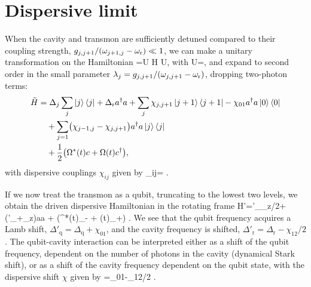 \section{Dispersive limit}\label{sec:dispersive}
When the cavity and transmon are sufficiently detuned compared to their coupling strength, $g_{j,j+1}/(\omega_{j+1,j}-\omega_{\text{r}}) \ll 1$, we can make a unitary transformation on the Hamiltonian
\be
    =U H U\dg,
\ee
with
\be
    \label{eq:dspunit}
    U=\exp{} ,
\ee
and expand to second order in the small parameter $\lambda_j=g_{j,j+1}/(\omega_{j,j+1}-\omega_{\text{r}})$, dropping two-photon terms:
\begin{equation}
    \label{eq:disp0}\begin{split}
    \tilde{H}&=\Delta_j\sum_j\left\lvert j \right\rangle\left\langle j \right\rvert+\Delta_\text{r}a^{\dag} a + \sum_j\chi_{j,j+1}\left\lvert j+1 \right\rangle\left\langle j+1 \right\rvert
        -\chi_{01}{a}^{\dag}{a}\left\lvert 0 \right\rangle\left\langle 0 \right\rvert\\
        &\quad+\sum_{j=1}\bigl(\chi_{j-1,j}-\chi_{j,j+1}\bigr){a}^{\dag}{a}\left\lvert j \right\rangle\left\langle j \right\rvert
        \\&\quad+ \frac{1}{2} \bigl(\Omega^*(t) c+ \Omega(t) c^{\dag} \bigr)
        ,
\end{split}\end{equation}
with dispersive couplings $\chi_{ij}$ given by%
%
\be
    \label{eq:chiij}
    \chi_{ij}= .
\ee
%

If we now treat the transmon as a qubit, truncating to the lowest two levels, we obtain the driven dispersive Hamiltonian in the rotating frame
\be
    \label{eq:dispqbit}
    H'=\Delta'_\sigma_z/2+\bigl(\Delta'_+\chi\sigma_z\bigr)a\dg a
    + \bigl(\Omega^*(t)\sigma_- + \Omega(t)\sigma_+\bigr) .
\ee
We see that the qubit frequency acquires a Lamb shift, $\Delta'_\text{q}=\Delta_\text{q}+\chi_{01}$, and the cavity frequency is shifted, $\Delta'_\text{r}=\Delta_\text{r}-\chi_{12}/2$. The qubit-cavity interaction can be interpreted either as a shift of the qubit frequency, dependent on the number of photons in the cavity (dynamical Stark shift), or as a shift of the cavity frequency dependent on the qubit state, with the dispersive shift $\chi$ given by
\be
    \label{eq:chi}
    \chi=\chi_{01}-\chi_{12}/2 .
\ee

